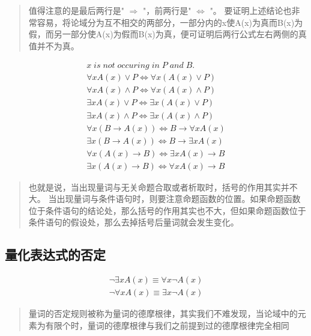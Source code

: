 \documentclass[12pt,a4paper,oneside]{ctexart}
\begin{document}
\begin{quote}
值得注意的是最后两行是" \(\Rightarrow\) "，前两行是" \(\Leftrightarrow\) "。 要证明上述结论也非常容易，将论域分为互不相交的两部分，一部分内的x使A(x)为真而B(x)为假，而另一部分使A(x)为假而B(x)为真，便可证明后两行公式左右两侧的真值并不为真。
\end{quote}

\[\begin{gathered}
x\; is\; not\; occuring\; in\; P\; and\; B.\\
\forall xA(x)\vee P\Leftrightarrow \forall x(A(x)\vee P)\\
\forall xA(x)\wedge P\Leftrightarrow \forall x(A(x)\wedge P)\\
\exists xA(x)\vee P\Leftrightarrow \exists x(A(x)\vee P)\\
\exists xA(x)\wedge P\Leftrightarrow\exists x(A(x)\wedge P)\\
\forall x(B\rightarrow A(x))\Leftrightarrow B\rightarrow\forall xA(x)\\
\exists x(B\rightarrow A(x))\Leftrightarrow B\rightarrow \exists xA(x)\\
\forall x(A(x)\rightarrow B)\Leftrightarrow \exists xA(x)\rightarrow B\\
\exists x(A(x)\rightarrow B)\Leftrightarrow\forall xA(x)\rightarrow B
\end{gathered}\]

\begin{quote}
也就是说，当出现量词与无关命题合取或者析取时，括号的作用其实并不大。 当出现量词与条件语句时，则要注意命题函数的位置。如果命题函数位于条件语句的结论处，那么括号的作用其实也不大，但如果命题函数位于条件语句的假设处，那么去掉括号后量词就会发生变化。
\end{quote}

\subsection*{量化表达式的否定}

\[\begin{gathered}
\neg\exists xA(x)\equiv\forall x\neg A(x)\\
\neg\forall xA(x)\equiv\exists x\neg A(x)
\end{gathered}\]

\begin{quote}
量词的否定规则被称为量词的德摩根律，其实我们不难发现，当论域中的元素为有限个时，量词的德摩根律与我们之前提到过的德摩根律完全相同
\end{quote}
\end{document}
